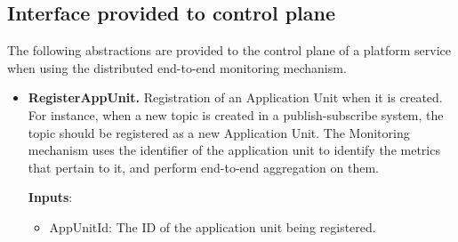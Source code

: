 \subsection{Interface provided to control plane}
The following abstractions are provided to the control plane of a platform service when using the distributed end-to-end monitoring mechanism.
\begin{itemize}
\item \textbf{RegisterAppUnit.} Registration of an Application Unit when it is created. For instance, when a new topic is created in a publish-subscribe system, the topic should be registered as a new Application Unit. The Monitoring mechanism uses the identifier of the application unit to identify the metrics that pertain to it, and perform end-to-end aggregation on them. 
\par \noindent \textbf{Inputs}:
\begin{itemize}
\item AppUnitId: The ID of the application unit being registered.
\end{itemize}


\end{itemize}
